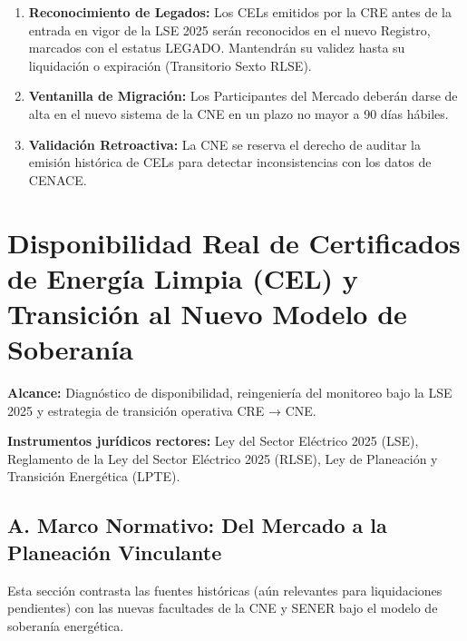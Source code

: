 \documentclass{cel}
\begin{document}
\begin{enumerate}
\item \textbf{Reconocimiento de Legados:} Los CELs emitidos por la CRE antes de la entrada en vigor de la LSE 2025 serán reconocidos en el nuevo Registro, marcados con el estatus \textquotedbl{}LEGADO\textquotedbl{}. Mantendrán su validez hasta su liquidación o expiración (Transitorio Sexto RLSE).
\item \textbf{Ventanilla de Migración:} Los Participantes del Mercado deberán darse de alta en el nuevo sistema de la CNE en un plazo no mayor a 90 días hábiles.
\item \textbf{Validación Retroactiva:} La CNE se reserva el derecho de auditar la emisión histórica de CELs para detectar inconsistencias con los datos de CENACE.

\end{enumerate}
\clearpage
{}
{}
\section*{Disponibilidad Real de Certificados de Energía Limpia (CEL) y Transición al Nuevo Modelo de Soberanía}
\nopagebreak

\textbf{Alcance:} Diagnóstico de disponibilidad, reingeniería del monitoreo bajo la LSE 2025 y estrategia de transición operativa CRE → CNE.

\textbf{Instrumentos jurídicos rectores:} Ley del Sector Eléctrico 2025 (LSE), Reglamento de la Ley del Sector Eléctrico 2025 (RLSE), Ley de Planeación y Transición Energética (LPTE).



\subsection{A. Marco Normativo: Del Mercado a la Planeación Vinculante}
\nopagebreak

Esta sección contrasta las fuentes históricas (aún relevantes para liquidaciones pendientes) con las nuevas facultades de la CNE y SENER bajo el modelo de soberanía energética.
\end{document}

